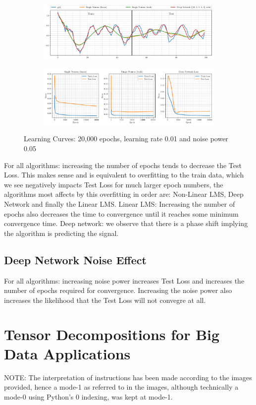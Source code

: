 \documentclass[12pt]{article}
\begin{document}
		\begin{figure}[H]
			\centering
			\begin{subfigure}{\textwidth}
				\centering
				\includegraphics[width=\textwidth]{../Python/figures/Q4_LMS2DL_4_7+8_04.pdf} 
				\captionsetup{justification=centering}
			\end{subfigure}
			\begin{subfigure}{\textwidth}
				\centering
				\includegraphics[width=\textwidth]{../Python/figures/Q4_LMS2DL_4_7+8_17.pdf} 
				\captionsetup{justification=centering}
			\end{subfigure}

			\captionsetup{justification=centering}
			\caption{Learning Curves: 20,000 epochs, learning rate 0.01 and noise power 0.05}
			\label{fig: 4-7}
		\end{figure}

		For all algorithms: increasing the number of epochs tends to decrease the Test Loss. This makes sense and is equivalent to overfitting to the train data, which we see negatively impacts Test Loss for much larger epoch numbers, the algorithms most affects by this overfitting in order are: Non-Linear LMS, Deep Network and finally the Linear LMS.
		Linear LMS: Increasing the number of epochs also decreases the time to convergence until it reaches some minimum convergence time.
		Deep network: we observe that there is a phase shift implying the algorithm is predicting the signal.

	\subsection{Deep Network Noise Effect} \label{sec: 4-7-DL-noise}
		For all algorithms: increasing noise power increases Test Loss and increases the number of epochs required for convergence. Increasing the noise power also increases the likelihood that the Test Loss will not convegre at all.
	
\section{Tensor Decompositions for Big Data Applications} \label{sec: 5-TD-BD}
	NOTE: The interpretation of instructions has been made according to the images provided, hence a mode-1 as referred to in the images, although technically a mode-0 using Python's 0 indexing, was kept at mode-1.
	
\end{document}
